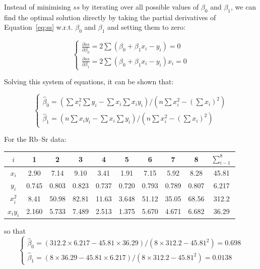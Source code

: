 Instead of minimising $ss$ by iterating over all possible values of
$\beta_0$ and $\beta_1$, we can find the optimal solution directly by
taking the partial derivatives of Equation~\ref{eq:ss}
w.r.t. $\beta_0$ and $\beta_1$ and setting them to zero:

\begin{equation}
\begin{cases}
    \frac{\partial ss}{\partial\beta_0} = 2 \sum(\beta_0 + \beta_1 x_i - y_i) = 0\\
    \frac{\partial ss}{\partial\beta_1} = 2 \sum(\beta_0 + \beta_1 x_i - y_i) x_i = 0
\end{cases}
\end{equation}

Solving this system of equations, it can be shown that:

\begin{equation}
\begin{cases}
  \hat{\beta}_0 = \left(\sum x_i^2 \sum y_i - \sum x_i \sum x_iy_i\right) /
  \left(n \sum x_i^2 - \left(\sum x_i\right)^2\right)\\
  \hat{\beta}_1 = \left(n\sum x_iy_i - \sum x_i \sum y_i \right) /
  \left(n \sum x_i^2 - \left(\sum x_i\right)^2\right)
\end{cases}
\label{eq:fitab}
\end{equation}

For the Rb--Sr data:

\begin{center}
  \begin{tabular}{c|cccccccc|c}
    $i$ & 1 & 2 & 3 & 4 & 5 & 6 & 7 & 8 & $\sum_{i-1}^{8}$ \\ \hline
    $x_i$ & 2.90 & 7.14 & 9.10 & 3.41 & 1.91 & 7.15 & 5.92 & 8.28 & 45.81 \\
    $y_i$ & 0.745 & 0.803 & 0.823 & 0.737 & 0.720 &
    0.793 & 0.789 & 0.807 & 6.217\\ \hline
    $x_i^2$ & 8.41 & 50.98 & 82.81 & 11.63 & 3.648 &
    51.12 & 35.05 & 68.56 & 312.2 \\
    $x_iy_i$ & 2.160 & 5.733 & 7.489 & 2.513 & 1.375 &
    5.670 & 4.671 & 6.682 & 36.29
  \end{tabular}
\end{center}

\noindent so that
\begin{equation*}
\begin{cases}
  \hat{\beta}_0 = \left(312.2 \times 6.217 - 45.81 \times 36.29 \right) /
  \left(8 \times 312.2 - 45.81^2\right) = 0.698 \\
  \hat{\beta}_1 = \left( 8 \times 36.29 - 45.81 \times 6.217 \right) /
  \left(8 \times 312.2 - 45.81^2\right) = 0.0138
\end{cases}
\end{equation*}

